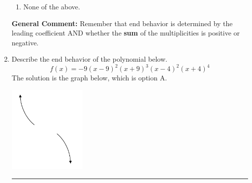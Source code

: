 \documentclass{extbook}[14pt]
\newcommand{\litem}[1]{\item #1

\rule{\textwidth}{0.4pt}}
\begin{document}
\begin{enumerate}
{\begin{enumerate}[label=\Alph*.]
\item None of the above.\end{enumerate}
\textbf{General Comment:} Remember that end behavior is determined by the leading coefficient AND whether the \textbf{sum} of the multiplicities is positive or negative.
}
\litem{
Describe the end behavior of the polynomial below.
\[ f(x) = -9(x - 9)^{2}(x + 9)^{3}(x - 4)^{2}(x + 4)^{4} \]
The solution is the graph below, which is option A.
\begin{center}
    \includegraphics[width=0.3\textwidth]{../Figures/polyEndBehaviorAA.png}
\end{center}\begin{enumerate}[label=\Alph*.]

\end{enumerate}}
\end{enumerate}
\end{document}
